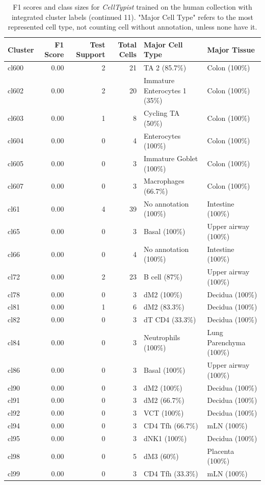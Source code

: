 \begin{table}[ht!]
\scriptsize
\caption[F1 scores and class sizes for \textit{CellTypist} trained on the human collection with integrated cluster labels (continued 11)]{F1 scores and class sizes for \textit{CellTypist} trained on the human collection with integrated cluster labels (continued 11). "Major Cell Type" refers to the most represented cell type, not counting cell without annotation, unless none have it.}
\centering
\label{table:tab_HAmodelclust11}
\begin{tabular}{lrrrll}
  \toprule
Cluster & F1 Score & Test Support & Total Cells & Major Cell Type & Major Tissue \\ 
  \midrule  
  cl600 & 0.00 &   2 &  21 & TA 2 (85.7\%) & Colon (100\%) \\ 
  cl602 & 0.00 &   2 &  20 & Immature Enterocytes 1 (35\%) & Colon (100\%) \\ 
  cl603 & 0.00 &   1 &   8 & Cycling TA (50\%) & Colon (100\%) \\ 
  cl604 & 0.00 &   0 &   4 & Enterocytes (100\%) & Colon (100\%) \\ 
  cl605 & 0.00 &   0 &   3 & Immature Goblet (100\%) & Colon (100\%) \\ 
  cl607 & 0.00 &   0 &   3 & Macrophages (66.7\%) & Colon (100\%) \\ 
  cl61 & 0.00 &   4 &  39 & No annotation (100\%) & Intestine (100\%) \\ 
  cl65 & 0.00 &   0 &   3 & Basal (100\%) & Upper airway (100\%) \\ 
  cl66 & 0.00 &   0 &   4 & No annotation (100\%) & Intestine (100\%) \\ 
  cl72 & 0.00 &   2 &  23 & B cell (87\%) & Upper airway (100\%) \\ 
  cl78 & 0.00 &   0 &   3 & dM2 (100\%) & Decidua (100\%) \\ 
  cl81 & 0.00 &   1 &   6 & dM2 (83.3\%) & Decidua (100\%) \\ 
  cl82 & 0.00 &   0 &   3 & dT CD4 (33.3\%) & Decidua (100\%) \\ 
  cl84 & 0.00 &   0 &   3 & Neutrophils (100\%) & Lung Parenchyma (100\%) \\ 
  cl86 & 0.00 &   0 &   3 & Basal (100\%) & Upper airway (100\%) \\ 
  cl90 & 0.00 &   0 &   3 & dM2 (100\%) & Decidua (100\%) \\ 
  cl91 & 0.00 &   0 &   3 & dM2 (66.7\%) & Decidua (100\%) \\ 
  cl92 & 0.00 &   0 &   3 & VCT (100\%) & Decidua (100\%) \\ 
  cl94 & 0.00 &   0 &   3 & CD4 Tfh (66.7\%) & mLN (100\%) \\ 
  cl95 & 0.00 &   0 &   3 & dNK1 (100\%) & Decidua (100\%) \\ 
  cl98 & 0.00 &   0 &   5 & dM3 (60\%) & Placenta (100\%) \\ 
  cl99 & 0.00 &   0 &   3 & CD4 Tfh (33.3\%) & mLN (100\%) \\ 
   \bottomrule
\end{tabular}
\end{table}


